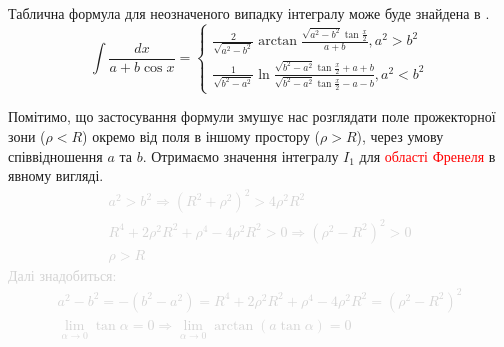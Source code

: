 Таблична формула для неозначеного випадку інтегралу може буде знайдена в 
\cite[ст. 181]{ElementFunc1983}.
%
\begin{equation} \label{eq:caseTableIntegral}
\int \frac{d x}{a + b \cos{x}} = \begin{cases}
\frac{2}{\sqrt{a^2-b^2}} \arctan \frac{\sqrt{a^2-b^2} \tan \frac{x}{2}}
{a + b}, a^2 > b^2 \\
\frac{1}{\sqrt{b^2-a^2}} \ln 
\frac{\sqrt{b^2-a^2} \tan \frac{x}{2} + a + b}
{\sqrt{b^2-a^2} \tan \frac{x}{2} - a - b}, a^2 < b^2
\end{cases}
\end{equation}

Помітимо, що застосування формули змушує нас розглядати поле прожекторної зони
($ \rho < R $) окремо від поля в іншому простору ($ \rho > R $), через умову 
співвідношення $ a $ та $ b $. Отримаємо значення інтегралу $ I_1 $ для 
\textcolor{red}{області Френеля} в явному вигляді.
%
\textcolor{lightgray}{ \begin{equation*} \begin{aligned}
a^2 > b^2  \Rightarrow  
\left( R^2 + \rho^2 \right)^2 > 4 \rho^2 R^2 \\
R^4 + 2 \rho^2 R^2 + \rho^4 - 4 \rho^2 R^2 > 0 \Rightarrow 
\left( \rho^2 - R^2 \right)^2 > 0 \\
\rho > R
\end{aligned} \end{equation*} }
%
\textcolor{lightgray}{ Далі знадобиться: }
%
\textcolor{lightgray}{ \begin{equation*} \begin{aligned}
a^2 - b^2 = - \left( b^2 - a^2 \right) = 
R^4 + 2 \rho^2 R^2 + \rho^4 - 4 \rho^2 R^2 = \left( \rho^2 - R^2 \right)^2 \\
\lim_{\alpha \to 0} \tan{\alpha} = 0 \Rightarrow
\lim_{\alpha \to 0} \arctan \left( a \tan{\alpha} \right) = 0
\end{aligned} \end{equation*} }
%
